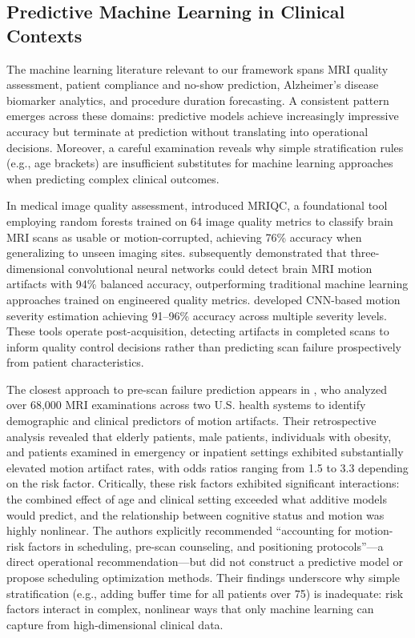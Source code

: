 \subsection{Predictive Machine Learning in Clinical Contexts}

The machine learning literature relevant to our framework spans MRI quality assessment, patient compliance and no-show prediction, Alzheimer's disease biomarker analytics, and procedure duration forecasting. A consistent pattern emerges across these domains: predictive models achieve increasingly impressive accuracy but terminate at prediction without translating into operational decisions. Moreover, a careful examination reveals why simple stratification rules (e.g., age brackets) are insufficient substitutes for machine learning approaches when predicting complex clinical outcomes.

In medical image quality assessment, \citet{esteban2017mriqc} introduced MRIQC, a foundational tool employing random forests trained on 64 image quality metrics to classify brain MRI scans as usable or motion-corrupted, achieving 76\% accuracy when generalizing to unseen imaging sites. \citet{vakli2023automatic} subsequently demonstrated that three-dimensional convolutional neural networks could detect brain MRI motion artifacts with 94\% balanced accuracy, outperforming traditional machine learning approaches trained on engineered quality metrics. \citet{beljaards2024motion} developed CNN-based motion severity estimation achieving 91--96\% accuracy across multiple severity levels. These tools operate post-acquisition, detecting artifacts in completed scans to inform quality control decisions rather than predicting scan failure prospectively from patient characteristics.

The closest approach to pre-scan failure prediction appears in \citet{porembka2025disparities}, who analyzed over 68,000 MRI examinations across two U.S. health systems to identify demographic and clinical predictors of motion artifacts. Their retrospective analysis revealed that elderly patients, male patients, individuals with obesity, and patients examined in emergency or inpatient settings exhibited substantially elevated motion artifact rates, with odds ratios ranging from 1.5 to 3.3 depending on the risk factor. Critically, these risk factors exhibited significant interactions: the combined effect of age and clinical setting exceeded what additive models would predict, and the relationship between cognitive status and motion was highly nonlinear. The authors explicitly recommended ``accounting for motion-risk factors in scheduling, pre-scan counseling, and positioning protocols''---a direct operational recommendation---but did not construct a predictive model or propose scheduling optimization methods. Their findings underscore why simple stratification (e.g., adding buffer time for all patients over 75) is inadequate: risk factors interact in complex, nonlinear ways that only machine learning can capture from high-dimensional clinical data.

